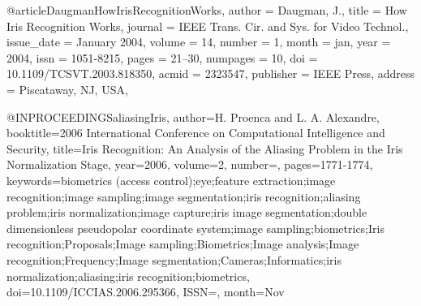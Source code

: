 \documentclass[10pt,polish,a4paper,oneside]{ppfcmthesis}
\begin{document}
{\raggedright\sloppy{}

@article{DaugmanHowIrisRecognitionWorks,
    author = {Daugman, J.},
    title = {How Iris Recognition Works},
    journal = {IEEE Trans. Cir. and Sys. for Video Technol.},
    issue_date = {January 2004},
    volume = {14},
    number = {1},
    month = jan,
    year = {2004},
    issn = {1051-8215},
    pages = {21--30},
    numpages = {10},
    doi = {10.1109/TCSVT.2003.818350},
    acmid = {2323547},
    publisher = {IEEE Press},
    address = {Piscataway, NJ, USA},
}

@INPROCEEDINGS{aliasingIris,
    author={H. {Proenca} and L. A. {Alexandre}},
    booktitle={2006 International Conference on Computational Intelligence and Security},
    title={Iris Recognition: An Analysis of the Aliasing Problem in the Iris Normalization Stage},
    year={2006},
    volume={2},
    number={},
    pages={1771-1774},
    keywords={biometrics (access control);eye;feature extraction;image recognition;image sampling;image segmentation;iris recognition;aliasing problem;iris normalization;image capture;iris image segmentation;double dimensionless pseudopolar coordinate system;image sampling;biometrics;Iris recognition;Proposals;Image sampling;Biometrics;Image analysis;Image recognition;Frequency;Image segmentation;Cameras;Informatics;iris normalization;aliasing;iris recognition;biometrics},
    doi={10.1109/ICCIAS.2006.295366},
    ISSN={},
    month={Nov}
}

}
\end{document}
